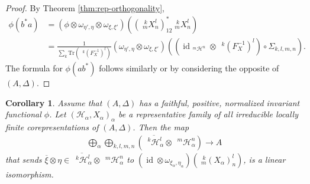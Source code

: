 \documentclass[12pt]{article}
\theoremstyle{change}
\DeclareMathOperator{\id}{id}
\newcommand{\Tr}{\mathrm{Tr}}
\newcommand{\Gr}[5]{\;{}^{\;#2}_{#4}#1_{#5}^{#3}}%
\newcommand{\Gru}[3]{\;{}^{\;#2}#1^{#3}}
\newtheorem{Cor}[Theorem]{Corollary}
\theoremstyle{definition}
\numberwithin{equation}{section}
\begin{document}
\begin{proof}
  By Theorem \ref{thm:rep-orthogonality}, 
  \begin{align*}
    \phi(b^{*}a) &= (\phi \otimes \omega_{\eta',\eta} \otimes
    \omega_{\xi,\xi'})((\Gr{X}{k}{l}{m}{n})_{12}^{*}\Gr{X}{k}{l}{m}{n})
    \\
    &= \frac{1}{\sum_{k} \Tr(\Gru{(F_{X}^{-1})}{k}{l})} 
    (\omega_{\eta',\eta} \otimes
    \omega_{\xi,\xi'})(   (
    \id_{\Gru{\mathcal{H}}{m}{n}} \otimes \Gru{(F_{X}^{-1})}{k}{l})
    \circ \Sigma_{k,l,m,n}). 
  \end{align*}
  The formula for $\phi(ab^{*})$ follows similarly or by considering
  the opposite of $(A,\Delta)$.
\end{proof}
\begin{Cor} \label{cor:rep-pw}
  Assume that $(A,\Delta)$ has a faithful, positive, normalized
  invariant functional $\phi$. Let
  $(\mathcal{H}_{\alpha},X_{\alpha})_{\alpha}$ be a representative
  family of all irreducible locally finite corepresentations of
  $(A,\Delta)$. Then the map
  \begin{align*}
    \bigoplus_{\alpha} \bigoplus_{k,l,m,n}
    (\overline{\Gru{\mathcal{H}_{\alpha}}{k}{l}} \otimes
    \Gru{\mathcal{H}_{\alpha}}{m}{n}) \to A
  \end{align*}
  that sends $\overline{\xi} \otimes \eta \in
  \overline{\Gru{\mathcal{H}_{\alpha}}{k}{l}} \otimes
  \Gru{\mathcal{H}_{\alpha}}{m}{n}$ to $ (\id \otimes
  \omega_{\xi_{\alpha},\eta_{\alpha}})(\Gr{(X_{\alpha})}{k}{l}{m}{n})$,
  is a linear isomorphism.
\end{Cor}
\end{document}
